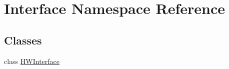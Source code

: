 \hypertarget{namespace_interface}{\section{Interface Namespace Reference}
\label{namespace_interface}
}
\subsection*{Classes}
\begin{DoxyCompactItemize}
\item 
class \hyperlink{class_interface_1_1_h_w_interface}{H\-W\-Interface}
\end{DoxyCompactItemize}
